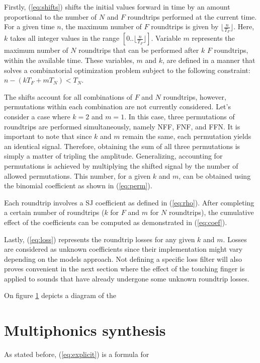 \documentclass{sigchi}
\begin{document}
Firstly, (\ref{eq:shifts}) shifts the initial values forward in time by an amount proportional to the number of $N$ and $F$ roundtrips performed at the current time.
For a given time $n$, the maximum number of $F$ roundtrips is given by $\lfloor \frac{n}{T_F} \rfloor$.
Here, $k$ takes all integer values in the range $[0..\lfloor \frac{n}{T_F} \rfloor]$.
Variable $m$ represents the maximum number of $N$ roundtrips that can be performed after $k$ $F$ roundtrips, within the available time.
These variables, $m$ and $k$, are defined in a manner that solves a combinatorial optimization problem subject to the following constraint: $n - (kT_F + mT_N) < T_N$.

The shifts account for all combinations of $F$ and $N$ roundtrips, however, permutations within each combination are not currently considered.
Let's consider a case where $k = 2$ and $m = 1$.
In this case, three permutations of roundtrips are performed simultaneously, namely NFF, FNF, and FFN.
It is important to note that since $k$ and $m$ remain the same, each permutation yields an identical signal.
Therefore, obtaining the sum of all three permutations is simply a matter of tripling the amplitude.
Generalizing, accounting for permutations is achieved by multiplying the shifted signal by the number of allowed permutations.
This number, for a given $k$ and $m$, can be obtained using the binomial coefficient as shown in (\ref{eq:perm}).

Each roundtrip involves a SJ coefficient as defined in (\ref{eq:rho}).
After completing a certain number of roundtrips ($k$ for $F$ and $m$ for $N$ roundtrips), the cumulative effect of the coefficients can be computed as demonstrated in (\ref{eq:coef}).

Lastly, (\ref{eq:loss}) represents the roundtrip losses for any given $k$ and $m$.
Losses are considered as unknown coefficients since their implementation might vary depending on the models approach.
Not defining a specific loss filter will also proves convenient in the next section where the effect of the touching finger is applied to sounds that have already undergone some unknown roundtrip losses.

\begin{figure}[h]
	\centering
	\scalebox{1}{}
	\caption{}
	\label{fig:triangle}
\end{figure}

On figure \ref{fig:triangle} depicts a diagram of the

\section{Multiphonics synthesis}
As stated before, (\ref{eq:explicit}) is a formula for
\end{document}
